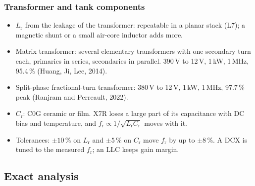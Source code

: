 \begin{frame}
	\frametitle{Transformer and tank components}
	\begin{itemize}
		\item $L_\mathrm{r}$ from the leakage of the transformer: repeatable in a planar stack (L7); a magnetic shunt or a small air-core inductor adds more.
		\item Matrix transformer: several elementary transformers with one secondary turn each, primaries in series, secondaries in parallel. 390\,V to 12\,V, 1\,kW, 1\,MHz, 95.4\,\% (Huang, Ji, Lee, 2014).
		\item Split-phase fractional-turn transformer: 380\,V to 12\,V, 1\,kW, 1\,MHz, 97.7\,\% peak (Ranjram and Perreault, 2022).
		\item $C_\mathrm{r}$: C0G ceramic or film. X7R loses a large part of its capacitance with DC bias and temperature, and $f_\mathrm{r}\propto1/\sqrt{L_\mathrm{r}C_\mathrm{r}}$ moves with it.
		\item Tolerances: $\pm10$\,\% on $L_\mathrm{r}$ and $\pm5$\,\% on $C_\mathrm{r}$ move $f_\mathrm{r}$ by up to $\pm8$\,\%. A DCX is tuned to the measured $f_\mathrm{r}$; an LLC keeps gain margin.
	\end{itemize}
\end{frame}

\subsection{Exact analysis}


